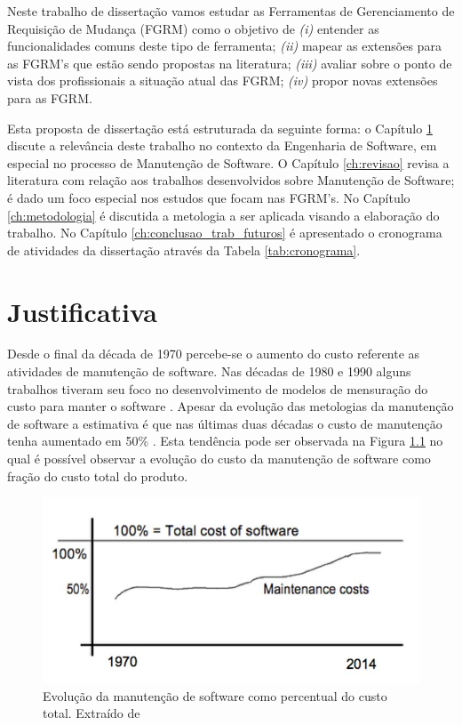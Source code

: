 \documentclass[msc,proposal,hidelot,hideabstract]{ppgccufmg} %
\begin{document}
Neste trabalho de dissertação vamos estudar as Ferramentas de Gerenciamento de Requisição de Mudança (FGRM) como o objetivo de \textit{(i)} entender as funcionalidades comuns deste tipo de ferramenta; \textit{(ii)} mapear as extensões para as FGRM's que estão sendo propostas na literatura; \textit{(iii)} avaliar sobre o ponto de vista dos profissionais a situação atual das FGRM; \textit{(iv)} propor novas extensões para as FGRM.
	
Esta proposta de dissertação está estruturada da seguinte forma: o  Capítulo
\ref{ch:justificativa} discute a relevância deste trabalho no contexto da Engenharia de Software, em especial no processo de Manutenção de Software. O Capítulo \ref{ch:revisao} revisa a literatura com relação aos trabalhos desenvolvidos sobre Manutenção de Software; é dado um foco especial
nos estudos que focam nas FGRM's. No Capítulo \ref{ch:metodologia} é discutida a metologia a ser aplicada visando a elaboração do trabalho. No Capítulo \ref{ch:conclusao_trab_futuros} é apresentado o cronograma de atividades da dissertação através da Tabela \ref{tab:cronograma}.

\chapter{Justificativa}
\label{ch:justificativa}
Desde o final da década de 1970 \cite{Zelkowitz:1979:PSE:578504} percebe-se o aumento do custo referente as atividades de  manutenção de software. Nas décadas de 1980 e 1990 alguns
trabalhos tiveram seu foco no desenvolvimento de modelos de mensuração do custo
para manter o software \cite{Herrin:1985:SMC:323287.323383,hirota1994approach}. Apesar da evolução das metologias da manutenção de software a estimativa é que nas últimas duas décadas o custo de manutenção tenha aumentado em 50\% \cite{koskinen2010software}. Esta tendência pode ser observada na Figura \ref{fig:software-maintence-costs} no qual é possível observar a evolução do custo da manutenção de software como fração do custo total do produto.

\begin{figure}
\centering
\includegraphics[width=0.7\linewidth]{../img/software-maintence-costs}
\caption{Evolução da manutenção de software como percentual do custo total.	Extraído de	\cite{engelbertink2010save}}

\label{fig:software-maintence-costs}
\end{figure}
\end{document}
